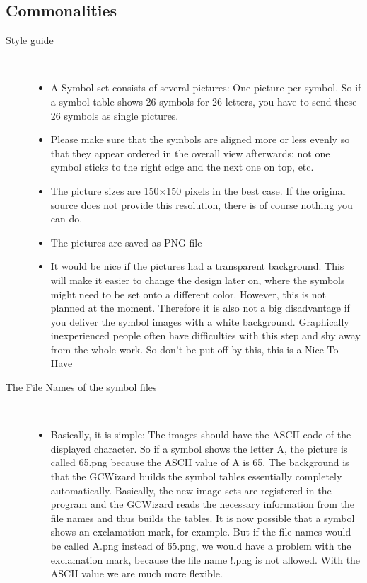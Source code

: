 \subsection{Commonalities}
\begin{description}
    \item [Style guide] \,
    \begin{itemize}
        \item A Symbol-set consists of several pictures: One picture per symbol. So if a symbol table shows 26 symbols for 26 letters, you have to send these 26 symbols as single pictures.
        \item Please make sure that the symbols are aligned more or less evenly so that they appear ordered in the overall view afterwards: not one symbol sticks to the right edge and the next one on top, etc.
        \item The picture sizes are 150×150 pixels in the best case. If the original source does not provide this resolution, there is of course nothing you can do.
        \item The pictures are saved as PNG-file
        \item It would be nice if the pictures had a transparent background. This will make it easier to change the design later on, where the symbols might need to be set onto a different color. However, this is not planned at the moment. Therefore it is also not a big disadvantage if you deliver the symbol images with a white background. Graphically inexperienced people often have difficulties with this step and shy away from the whole work. So don’t be put off by this, this is a Nice-To-Have
    \end{itemize}
    \item [The File Names of the symbol files] \,
    \begin{itemize}
        \item Basically, it is simple: The images should have the ASCII code of the displayed character. So if a symbol shows the letter A, the picture is called 65.png because the ASCII value of A is 65. The background is that the GCWizard builds the symbol tables essentially completely automatically. Basically, the new image sets are registered in the program and the GCWizard reads the necessary information from the file names and thus builds the tables. It is now possible that a symbol shows an exclamation mark, for example. But if the file names would be called A.png instead of 65.png, we would have a problem with the exclamation mark, because the file name !.png is not allowed. With the ASCII value we are much more flexible.

\end{itemize}
\end{description}

